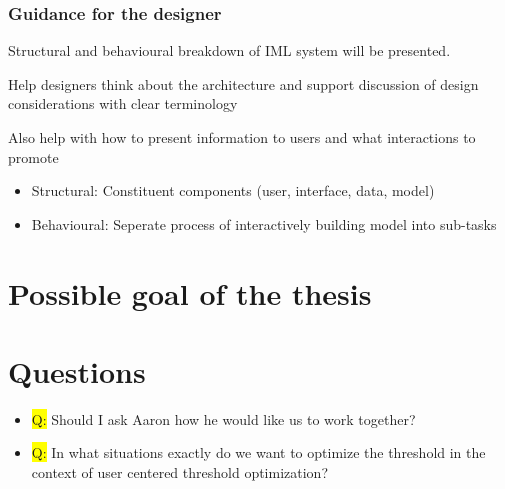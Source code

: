 \documentclass[12pt,a4paper]{article}
\begin{document}
\subsubsection{Guidance for the designer}
Structural and behavioural breakdown of IML system will be presented.
\begin{description}
\item Help designers think about the architecture and support discussion of design considerations with clear terminology
\item Also help with how to present information to users and what interactions to promote
\end{description}
\begin{itemize}
\item Structural: Constituent components (user, interface, data, model)
\item Behavioural: Seperate process of interactively building model into sub-tasks
\end{itemize}

\section{Possible goal of the thesis}

%
%
%
%
%
\section*{Questions}
\begin{itemize}
%
\item \colorbox{yellow}{Q:} Should I ask Aaron how he would like us to work together?
%
\item \colorbox{yellow}{Q:} In what situations exactly do we want to optimize the threshold in the context of user centered threshold optimization?
%
\end{itemize}
\end{document}

